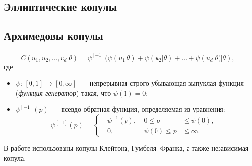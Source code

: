 \documentclass[aspectratio=169]{beamer}
\begin{document}
\subsection{Эллиптические копулы}


\subsection{Архимедовы копулы}

\begin{frame}{\insertsection}
    \framesubtitle{\insertsubsection}
    \begin{equation}
        C(u_1,u_2,\ldots,u_d|\theta) = \psi^{[-1]}(\psi(u_1|\theta)+\psi(u_2|\theta) + \ldots + \psi(u_d|\theta) | \theta ),
    \end{equation}
    где
    \begin{itemize}
        \item $\psi$: $[0,1] \rightarrow [0, \infty]$~--- непрерывная строго убывающая выпуклая функция (\textit{функция-генератор}) такая, что $\psi(1) = 0$;
        \item $\psi^{[-1]}(p)$~--- псевдо-обратная функция, определяемая из уравнения:
        $$\psi^{[-1]}(p) = \left\{ \begin{aligned}
            & \psi^{-1}(p), & \ 0 \le p & \le \psi(0), \\
            & 0,            & \ \psi(0) \le p & \le \infty.
        \end{aligned} \right.$$
    \end{itemize}
    В работе использованы копулы Клейтона, Гумбеля, Франка, а также независимая копула.
\end{frame}
\end{document}
